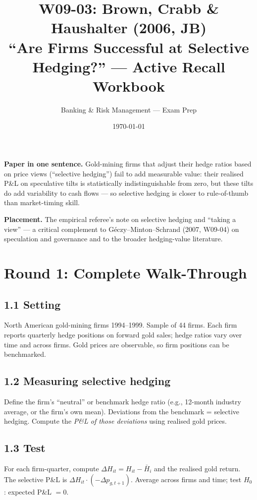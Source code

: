 \documentclass[11pt]{article}
\title{W09-03: Brown, Crabb \& Haushalter (2006, JB) \\
\large ``Are Firms Successful at Selective Hedging?'' --- Active Recall Workbook}
\author{Banking \& Risk Management --- Exam Prep}
\date{\today}
\begin{document}
\maketitle

\begin{keybox}
\textbf{Paper in one sentence.} Gold-mining firms that adjust their hedge ratios based on price views (``selective hedging'') fail to add measurable value: their realised P\&L on speculative tilts is statistically indistinguishable from zero, but these tilts do add variability to cash flows --- so selective hedging is closer to rule-of-thumb than market-timing skill.

\textbf{Placement.} The empirical referee's note on selective hedging and ``taking a view'' --- a critical complement to Géczy--Minton--Schrand (2007, W09-04) on speculation and governance and to the broader hedging-value literature.
\end{keybox}

\section*{Round 1: Complete Walk-Through}

\subsection*{1.1 Setting}
North American gold-mining firms 1994--1999. Sample of 44 firms. Each firm reports quarterly hedge positions on forward gold sales; hedge ratios vary over time and across firms. Gold prices are observable, so firm positions can be benchmarked.

\subsection*{1.2 Measuring selective hedging}
Define the firm's ``neutral'' or benchmark hedge ratio (e.g., 12-month industry average, or the firm's own mean). Deviations from the benchmark = selective hedging. Compute the \emph{P\&L of those deviations} using realised gold prices.

\subsection*{1.3 Test}
For each firm-quarter, compute $\Delta H_{it}=H_{it}-\bar H_i$ and the realised gold return. The selective P\&L is $\Delta H_{it}\cdot(-\Delta p_{g,t+1})$. Average across firms and time; test $H_0$: expected P\&L $= 0$.
\end{document}
